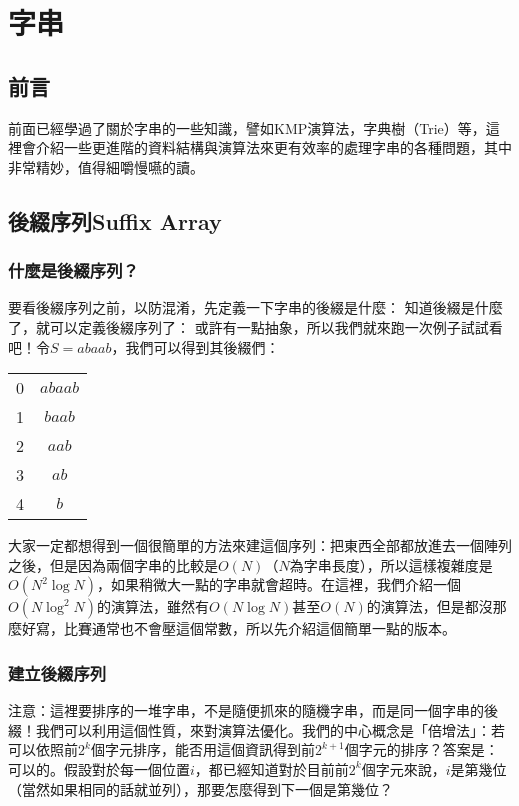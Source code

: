\documentclass[main.tex]{subfiles}
\begin{document}
\chapter{字串\uppercase\expandafter{}}
\section{前言}
		前面已經學過了關於字串的一些知識，譬如KMP演算法，字典樹（Trie）等，這裡會介紹一些更進階的資料結構與演算法來更有效率的處理字串的各種問題，其中非常精妙，值得細嚼慢嚥的讀。
	\section{後綴序列Suffix Array}
		\subsection{什麼是後綴序列？}
			要看後綴序列之前，以防混淆，先定義一下字串的後綴是什麼：
			知道後綴是什麼了，就可以定義後綴序列了：
			或許有一點抽象，所以我們就來跑一次例子試試看吧！令$S = abaab$，我們可以得到其後綴們：
			\begin{center}
				\begin{tabular}{c  c}
					0&$abaab$\\
					1&$baab$\\
					2&$aab$\\
					3&$ab$\\
					4&$b$\\
				\end{tabular}
			\end{center}
			大家一定都想得到一個很簡單的方法來建這個序列：把東西全部都放進去一個陣列之後，但是因為兩個字串的比較是$O(N)$（$N$為字串長度），所以這樣複雜度是$O(N^2 \log N)$，如果稍微大一點的字串就會超時。在這裡，我們介紹一個$O(N \log^2 N)$的演算法，雖然有$O(N \log N)$甚至$O(N)$的演算法，但是都沒那麼好寫，比賽通常也不會壓這個常數，所以先介紹這個簡單一點的版本。
		\subsection{建立後綴序列}
			注意：這裡要排序的一堆字串，不是隨便抓來的隨機字串，而是同一個字串的後綴！我們可以利用這個性質，來對演算法優化。我們的中心概念是「倍增法」：若可以依照前$2^k$個字元排序，能否用這個資訊得到前$2^{k + 1}$個字元的排序？答案是：可以的。假設對於每一個位置$i$，都已經知道對於目前前$2^k$個字元來說，$i$是第幾位（當然如果相同的話就並列），那要怎麼得到下一個是第幾位？
			
\end{document}
